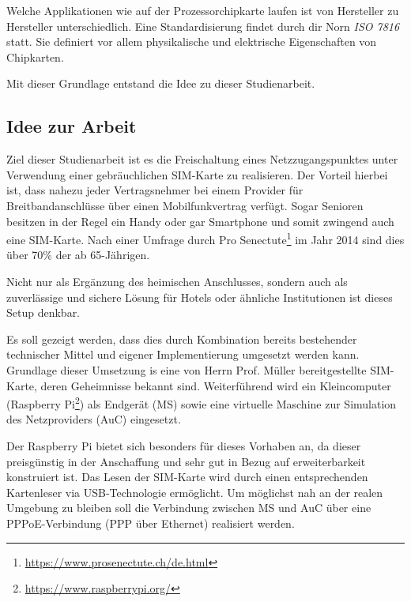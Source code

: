 Welche Applikationen wie auf der Prozessorchipkarte laufen ist von Hersteller zu Hersteller unterschiedlich.
Eine Standardisierung findet durch dir Norn \textit{ISO 7816} statt. Sie definiert vor allem physikalische
und elektrische Eigenschaften von Chipkarten.

Mit dieser Grundlage entstand die Idee zu dieser Studienarbeit.

\subsection{Idee zur Arbeit}
\label{idee-arbeit}
Ziel dieser Studienarbeit ist es die Freischaltung eines Netzzugangspunktes unter Verwendung einer 
gebräuchlichen \ac{SIM}-Karte zu realisieren. Der Vorteil hierbei ist, dass nahezu jeder
Vertragsnehmer bei einem Provider für Breitbandanschlüsse über einen Mobilfunkvertrag verfügt.
Sogar Senioren besitzen in der Regel ein Handy oder gar Smartphone und somit zwingend auch eine
\ac{SIM}-Karte. Nach einer Umfrage durch Pro Senectute\footnote{\url{https://www.prosenectute.ch/de.html}}
im Jahr 2014 sind dies über 70\% der ab 65-Jährigen.

Nicht nur als Ergänzung des heimischen Anschlusses, sondern auch als zuverlässige und sichere Lösung
für Hotels oder ähnliche Institutionen ist dieses Setup denkbar.

Es soll gezeigt werden, dass dies durch Kombination bereits bestehender technischer Mittel und
eigener Implementierung umgesetzt werden kann. Grundlage dieser Umsetzung is eine von Herrn Prof. Müller
bereitgestellte \ac{SIM}-Karte, deren Geheimnisse bekannt sind. Weiterführend wird ein Kleincomputer
(Raspberry Pi\footnote{\url{https://www.raspberrypi.org/}}) als Endgerät (\ac{MS}) sowie eine virtuelle
Maschine zur Simulation des Netzproviders (\ac{AuC}) eingesetzt. 

Der Raspberry Pi bietet sich besonders für dieses Vorhaben an, da dieser preisgünstig in der Anschaffung
und sehr gut in Bezug auf erweiterbarkeit konstruiert ist. Das Lesen der \ac{SIM}-Karte
wird durch einen entsprechenden Kartenleser via USB-Technologie ermöglicht. Um möglichst nah
an der realen Umgebung zu bleiben soll die Verbindung zwischen \ac{MS} und \ac{AuC} über eine
\ac{PPPoE}-Verbindung (\ac{PPP} über Ethernet) realisiert werden.

\clearpage